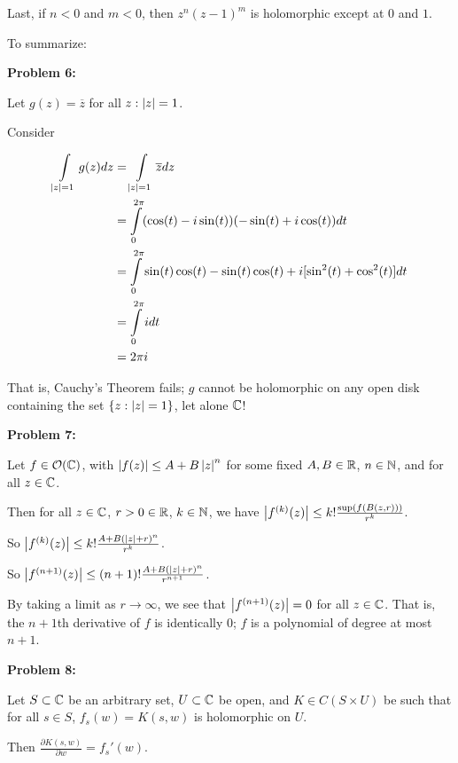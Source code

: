 \documentclass[a4paper,12pt]{article}
\begin{document}
Last, if $n < 0$ and $m < 0$, then $z^n(z-1)^m$ is holomorphic except at $0$ and $1$. %
\vspace{5mm}

To summarize:

\shunt

{\bf Problem 6:}

Let $g(z) = \overline{z}$ for all $z: \left\lvert z \right\rvert = 1$.

Consider 

\begin{align*}
\int\limits_{\left\lvert z \right\rvert=1} g(z)dz &= \int\limits_{\left\lvert z \right\rvert=1} \overline{z}dz\\
&= \int\limits_0^{2\pi} (\cos(t)-i\sin(t))(-\sin(t)+i\cos(t))dt\\
&= \int\limits_0^{2\pi} \sin(t)\cos(t)-\sin(t)\cos(t) + i[\sin^2(t)+\cos^2(t)]dt\\
&= \int\limits_0^{2\pi} idt\\
&=2\pi i
\end{align*}

That is, Cauchy's Theorem fails; $g$ cannot be holomorphic on any open disk containing the set $\{z: \left\lvert z \right\rvert = 1\}$, let alone $\mathbb{C}$!

\shunt

{\bf Problem 7:}

Let $f \in \mathcal{O}( \mathbb{C})$, with $\left\lvert f(z) \right\rvert \leq A + B\left\lvert z \right\rvert^n$ for some fixed $A, B \in \mathbb{R}$, $n \in \mathbb{N}$, and for all $z \in \mathbb{C}$.

Then for all $z \in \mathbb{C}$, $r>0 \in \mathbb{R}$, $k \in \mathbb{N}$, we have $\left\lvert f^{(k)}(z) \right\rvert \leq k! \frac{\sup(f(B(z,r)))}{r^k}$.

So $\left\lvert f^{(k)}(z) \right\rvert \leq k! \frac{A+B(\left\lvert z \right\rvert+r)^n}{r^k}$.

So $\left\lvert f^{(n+1)}(z) \right\rvert \leq (n+1)! \frac{A+B(\left\lvert z \right\rvert+r)^n}{r^{n+1}}$.

By taking a limit as $r \to \infty$, we see that $\left\lvert f^{(n+1)}(z) \right\rvert=0$ for all $z \in \mathbb{C}$. That is, the $n+1$th derivative of $f$ is identically $0$; $f$ is a polynomial of degree at most $n+1$.

\shunt

{\bf Problem 8:}

Let $S \subset \mathbb{C}$ be an arbitrary set, $U \subset \mathbb{C}$ be open, and $K \in C(S \times U)$ be such that for all $s \in S$, $f_s(w) = K(s,w)$ is holomorphic on $U$.

Then $\frac{\partial K(s,w)}{\partial w} = f_s'(w)$. %

\shunt
\end{document}
